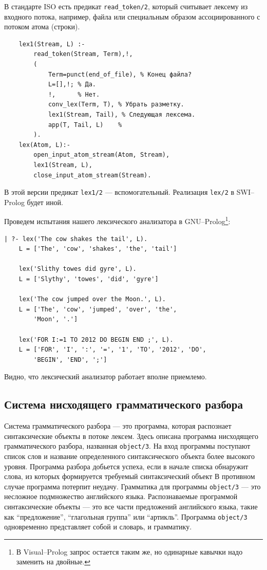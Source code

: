 \documentclass[12pt, openany, twoside]{book} %
\begin{document}
В стандарте ISO есть предикат \texttt{read\_token/2}, который считывает лексему из входного потока, например, файла или специальным образом ассоциированного с потоком атома (строки).
{\tt\begin{verbatim}
    lex1(Stream, L) :-
        read_token(Stream, Term),!,
        (
            Term=punct(end_of_file), % Конец файла?
            L=[],!; % Да.
            !,      % Нет.
            conv_lex(Term, T), % Убрать разметку.
            lex1(Stream, Tail), % Следующая лексема.
            app(T, Tail, L)    %
        ).
    lex(Atom, L):-
        open_input_atom_stream(Atom, Stream),
        lex1(Stream, L),
        close_input_atom_stream(Stream).
\end{verbatim}}
В этой версии предикат \texttt{lex1/2} --- вспомогательный. Реализация \texttt{lex/2} в SWI--Prolog будет иной.

Проведем испытания нашего лексического анализатора в GNU--Prolog\footnote{В Visual--Prolog запрос остается таким же, но одинарные кавычки надо заменить на двойные.}:
{\tt\begin{verbatim}
| ?- lex('The cow shakes the tail', L).
    L = ['The', 'cow', 'shakes', 'the', 'tail']

    lex('Slithy towes did gyre', L).
    L = ['Slythy', 'towes', 'did', 'gyre']

    lex('The cow jumped over the Moon.', L).
    L = ['The', 'cow', 'jumped', 'over', 'the',
        'Moon', '.']

    lex('FOR I:=1 TO 2012 DO BEGIN END ;', L).
    L = ['FOR', 'I', ':', '=', '1', 'TO', '2012', 'DO',
        'BEGIN', 'END', ';']
\end{verbatim}}
\noindent Видно, что лексический анализатор работает вполне приемлемо.

\subsection{Система нисходящего грамматического разбора}

Система грамматического разбора --- это программа, которая распознает синтаксические объекты в потоке лексем. Здесь описана программа нисходящего грамматического разбора, названная {\tt object/3}. На вход программы поступают список слов и название определенного синтаксического объекта более высокого уровня. Программа разбора добьется успеха, если в начале списка обнаружит слова, из которых формируется требуемый синтаксический объект В противном случае программа потерпит неудачу. Грамматика для программы {\tt object/3} --- это несложное подмножество английского языка. Распознаваемые программой синтаксические объекты --- это все части предложений английского языка, такие как ``предложение'', ``глагольная группа'' или ``артикль''. Программа {\tt object/3} одновременно представляет собой и словарь, и грамматику.
\end{document}
